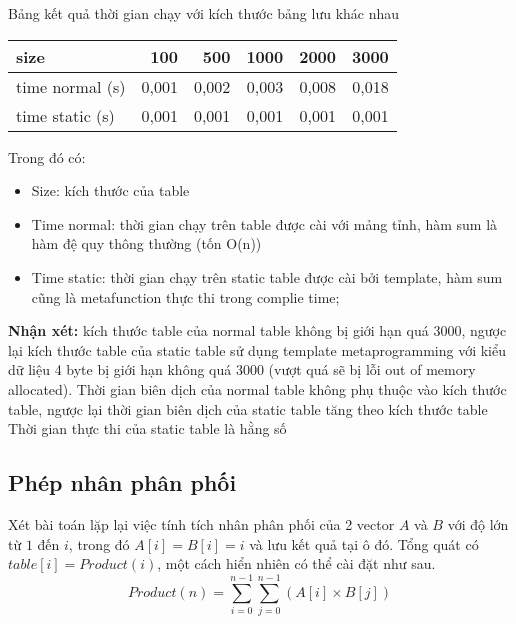 \noindent Bảng kết quả thời gian chạy với kích thước bảng lưu khác nhau
\begin{table}[!ht]
\centering
\begin{tabular}{|lrrrrr}
\hline
\multicolumn{1}{|l|}{size}        & \multicolumn{1}{r|}{100}   & \multicolumn{1}{r|}{500}   & \multicolumn{1}{r|}{1000}  & \multicolumn{1}{r|}{2000}  & \multicolumn{1}{r|}{3000}  \\ \hline
\multicolumn{1}{|l|}{time normal (s)} & \multicolumn{1}{r|}{0,001} & \multicolumn{1}{r|}{0,002} & \multicolumn{1}{r|}{0,003} & \multicolumn{1}{r|}{0,008} & \multicolumn{1}{r|}{0,018} \\ \hline
\multicolumn{1}{|l|}{time static (s)} & \multicolumn{1}{r|}{0,001} & \multicolumn{1}{r|}{0,001} & \multicolumn{1}{r|}{0,001} & \multicolumn{1}{r|}{0,001} & \multicolumn{1}{r|}{0,001} \\ \hline
\end{tabular}
\end{table}

\noindent Trong đó có:
\begin{itemize}
    \item Size: kích thước của table
    \item Time normal: thời gian chạy trên table được cài với mảng tỉnh, hàm sum là hàm đệ quy thông thường (tốn O(n))
    \item Time static: thời gian chạy trên static table được cài bởi template, hàm sum cũng là metafunction thực thi trong complie time;
\end{itemize}

\textbf{Nhận xét: }kích thước table của normal table không bị giới hạn quá 3000, ngược lại kích thước table của static table sử dụng template metaprogramming với kiểu dữ liệu 4 byte bị giới hạn không quá 3000 (vượt quá sẽ bị lỗi out of memory allocated).
Thời gian biên dịch của normal table không phụ thuộc vào kích thước table, ngược lại thời gian biên dịch của static table tăng theo kích thước table
Thời gian thực thi của static table là hằng số
\subsection{Phép nhân phân phối}
Xét bài toán lặp lại việc tính tích nhân phân phối của 2 vector $A$ và $B$ với độ lớn từ $1$ đến $i$, trong đó $A[i]=B[i]=i$ và lưu kết quả tại ô đó. Tổng quát có $table[i]=Product(i)$, một cách hiển nhiên có thể cài đặt như sau.
\begin{equation}
    Product(n) = \sum_{i=0}^{n - 1} \sum_{j=0}^{n - 1} (A[i] \times B[j])
\end{equation}

